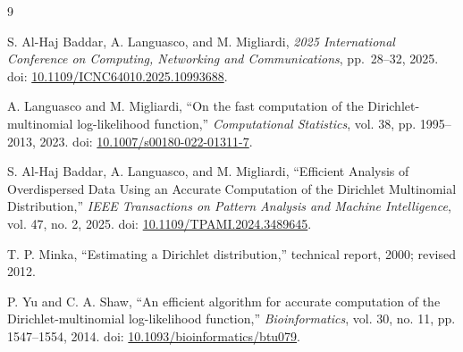 \begin{thebibliography}{9}

S. Al-Haj Baddar, A. Languasco, and M. Migliardi,
\emph{2025 International Conference on Computing, Networking and Communications},
pp.~28--32, 2025. doi: \href{https://doi.org/10.1109/ICNC64010.2025.10993688}{10.1109/ICNC64010.2025.10993688}.

A. Languasco and M. Migliardi,
``On the fast computation of the Dirichlet-multinomial log-likelihood function,''
\emph{Computational Statistics}, vol. 38, pp. 1995--2013, 2023.
doi: \href{https://doi.org/10.1007/s00180-022-01311-7}{10.1007/s00180-022-01311-7}.

S. Al-Haj Baddar, A. Languasco, and M. Migliardi,
``Efficient Analysis of Overdispersed Data Using an Accurate Computation of the
Dirichlet Multinomial Distribution,''
\emph{IEEE Transactions on Pattern Analysis and Machine Intelligence}, vol. 47,
no. 2, 2025.
doi: \href{https://doi.org/10.1109/TPAMI.2024.3489645}{10.1109/TPAMI.2024.3489645}.

T. P. Minka,
``Estimating a Dirichlet distribution,'' technical report, 2000; revised 2012.

P. Yu and C. A. Shaw,
``An efficient algorithm for accurate computation of the Dirichlet-multinomial
log-likelihood function,'' \emph{Bioinformatics}, vol. 30, no. 11,
pp. 1547--1554, 2014.
doi: \href{https://doi.org/10.1093/bioinformatics/btu079}{10.1093/bioinformatics/btu079}.

\end{thebibliography}
